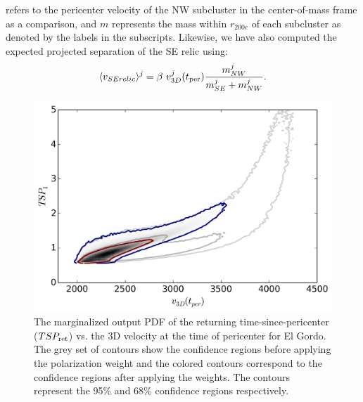 \documentclass[letterpaper,useAMS,usenatbib]{mn2e}
\begin{document}
refers to the pericenter velocity of
the NW subcluster in the center-of-mass frame as a comparison, and $m$
represents the mass within $r_{200c}$ of each subcluster as denoted by the
labels in the subscripts. 
Likewise, we have also computed the expected projected separation of the SE
relic using:  
\begin{equation}
	\label{eqn:SE_speed}
	\langle v_{SE relic} \rangle^j = \beta~v^j_{3D}(t_{\rm per}) \frac{m^j_{NW}}{m^j_{SE} + m^j_{NW}}. 
\end{equation}
\par 
\begin{figure}
	\includegraphics[width=\linewidth]{TwoMnWBSG_2contour2d.png}
	\caption{The marginalized output PDF of the returning time-since-pericenter
($TSP_{\rm ret}$) vs. the 3D velocity at the time of pericenter for El Gordo. The
grey set of contours show the confidence regions before applying the
polarization weight and the colored contours correspond to the confidence
regions after applying the weights. The contours represent the 95\% and
68\% confidence regions respectively. }
	\label{fig:TSP_v3D}
\end{figure}
\end{document}
